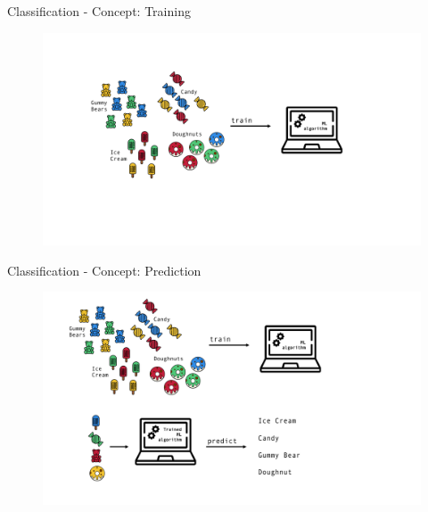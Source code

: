 \documentclass[aspectratio=169]{beamer}
\begin{document}
\begin{frame}{Classification - Concept: Training}
    \begin{figure}
        \centering
        \includegraphics[scale=0.5]{Figures/example_training.pdf}
    \end{figure}
\end{frame}

\begin{frame}{Classification - Concept: Prediction}
    \begin{figure}
        \centering
        \includegraphics[scale=0.5]{Figures/example_prediction.pdf}
    \end{figure}
\end{frame}
\end{document}
